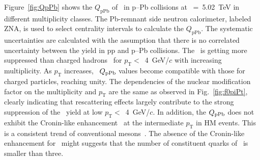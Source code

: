 Figure~\ref{fig:QpPb} shows the $Q_{\mbox{pPb}}$ of \fzero~in p--Pb collisions at \snn~=~5.02~TeV in different multiplicity classes. The Pb-remnant side neutron calorimeter, labeled ZNA, is used to select centrality intervals to calculate the $Q_{\mathrm{pPb}}$. The systematic uncertainties are calculated with the assumption that there is no correlated uncertainty between the yield in pp and p--Pb collisions. The \fzero~is getting more suppressed than charged hadrons~\cite{ALICE:2014xsp} for $p_{\mathrm{T}}<$~4~GeV/$c$ with increasing multiplicity. As $p_{\mathrm{T}}$ increases, \fzero~$Q_{\rm{pPb}}$ values become compatible with those for charged particles, reaching unity. The dependencies of the nuclear modification factor on the multiplicity and $p_{\mathrm{T}}$ are the same as observed in Fig.~\ref{fig:f0piPt}, clearly indicating that rescattering effects largely contribute to the strong suppression of the \fzero~yield at low $p_{\mathrm{T}}<$~4~GeV/$c$. In addition, the $Q_{\rm{pPb}}$ does not exhibit the Cronin-like enhancement~\cite{Cronin:1974zm} at the intermediate $p_{\mathrm{T}}$ in HM events. This is a consistent trend of conventional mesons~\cite{ALICE:2016dei, ALICE:2016sak}. The absence of the Cronin-like enhancement for \fzero~might suggests that the number of constituent quarks of \fzero~is smaller than three.